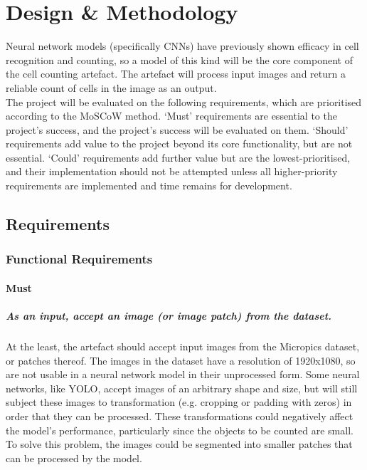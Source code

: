 
\chapter{Design \& Methodology}
Neural network models (specifically CNNs) have previously shown efficacy in cell recognition and counting, so a model of this kind will be the core component of the cell counting artefact. The artefact will process input images and return a reliable count of cells in the image as an output.\\

The project will be evaluated on the following requirements, which are prioritised according to the MoSCoW method. ‘Must’ requirements are essential to the project’s success, and the project’s success will be evaluated on them. ‘Should’ requirements add value to the project beyond its core functionality, but are not essential. ‘Could’ requirements add further value but are the lowest-prioritised, and their implementation should not be attempted unless all higher-priority requirements are implemented and time remains for development.

\section{Requirements}
\subsection{Functional Requirements}
\subsubsection{Must}
\paragraph{As an input, accept an image (or image patch) from the dataset.}
At the least, the artefact should accept input images from the Micropics dataset, or patches thereof. The images in the dataset have a resolution of 1920x1080, so are not usable in a neural network model in their unprocessed form. Some neural networks, like YOLO, accept images of an arbitrary shape and size, but will still subject these images to transformation (e.g. cropping or padding with zeros) in order that they can be processed. These transformations could negatively affect the model’s performance, particularly since the objects to be counted are small. To solve this problem, the images could be segmented into smaller patches that can be processed by the model.

